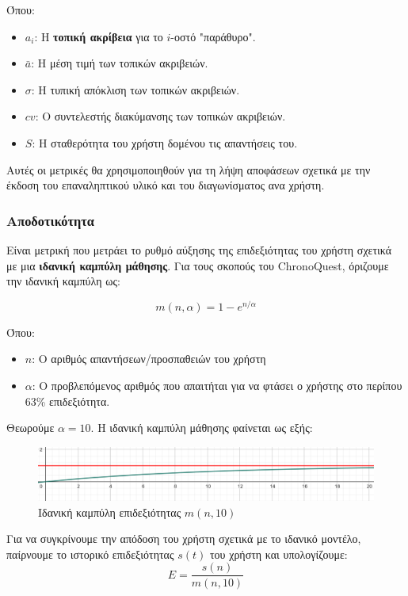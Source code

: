 \begin{itemize}
    Όπου:
    \begin{itemize}
        \item $a_i$: Η \textbf{τοπική ακρίβεια} για το $i$-οστό "παράθυρο".
        \item $\bar a$: Η μέση τιμή των τοπικών ακριβειών.
        \item $\sigma$: Η τυπική απόκλιση των τοπικών ακριβειών.
        \item $cv$: Ο συντελεστής διακύμανσης των τοπικών ακριβειών. 
        \item $S$: Η σταθερότητα του χρήστη δομένου τις απαντήσεις του.
    \end{itemize}
\end{itemize}

Αυτές οι μετρικές θα χρησιμοποιηθούν για τη λήψη αποφάσεων σχετικά με την έκδοση του επαναληπτικού υλικό και του διαγωνίσματος ανα χρήστη.

\subsubsection{Αποδοτικότητα}
Είναι μετρική που μετράει το ρυθμό αύξησης της επιδεξιότητας του χρήστη σχετικά με μια \textbf{ιδανική καμπύλη μάθησης}. Για τους σκοπούς του \textlatin{ChronoQuest}, όριζουμε την ιδανική καμπύλη ως:

$$
    m(n, \alpha) = 1 - e^{n/\alpha}
$$

Όπου:
\begin{itemize}
    \item $n$: Ο αριθμός απαντήσεων/προσπαθειών του χρήστη
    \item $\alpha$: Ο προβλεπόμενος αριθμός που απαιτήται για να φτάσει ο χρήστης στο περίπου 63\% επιδεξιότητα.
\end{itemize}

Θεωρούμε $\alpha = 10$. Η ιδανική καμπύλη μάθησης φαίνεται ως εξής:
\begin{figure}[H]
    \centering
    \includegraphics[width=1\linewidth]{img/LearningCurve.png}
    \caption{Ιδανική καμπύλη επιδεξιότητας $m(n, 10)$}
\end{figure}

Για να συγκρίνουμε την απόδοση του χρήστη σχετικά με το ιδανικό μοντέλο, παίρνουμε το ιστορικό επιδεξιότητας $s(t)$ του χρήστη και υπολογίζουμε:
$$
    E = \frac{s(n)}{m(n, 10)}
$$

